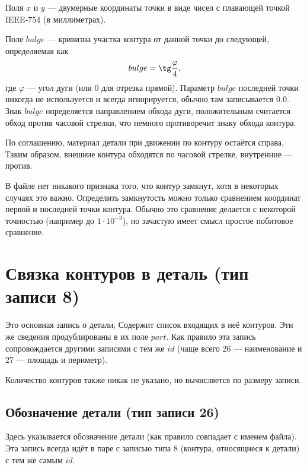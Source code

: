Поля
$x$ и $y$ ---
двумерные координаты точки в виде
чисел с плавающей точкой  IEEE-754
(в миллиметрах).

Поле
$bulge$ ---
кривизна участка контура от данной точки до следующей,
определяемая как
$$
bulge =
\tg \frac{\varphi}{4}
,
$$
где
$\varphi$ --- угол дуги
(или 0 для отрезка прямой).
Параметр $bulge$
последней точки никогда не используется и всегда игнорируется,
обычно там записывается $0.0$.
Знак
$bulge$
определяется направлением обхода дуги,
положительным считается обход против часовой стрелки,
что немного противоречит знаку обхода контура.

По соглашению,
материал детали при движении по контуру остаётся справа.
Таким образом, внешние контура обходятся по часовой стрелке,
внутренние --- против.

В файле нет никакого признака того,
что контур замкнут,
хотя в некоторых случаях это важно.
Определить замкнутость можно только сравнением координат первой и последней точки контура.
Обычно это сравнение делается с некоторой точностью
(например до $1\cdot 10^{-3}$),
но зачастую имеет смысл простое побитовое сравнение.

\section*{Связка контуров в деталь (тип записи 8)}
Это основная запись о детали,
Содержит список входящих в неё контуров.
Эти же сведения продублированы в их поле $part$.
Как правило эта запись сопровождается другими записями
с тем же $id$
(чаще всего 26 --- наименование и
27 --- площадь и периметр).


Количество контуров также никак не указано,
но вычисляется по размеру записи.

\subsection*{Обозначение детали (тип записи 26)}
Здесь указывается обозначение детали (как правило совпадает с именем файла).
Эта запись всегда идёт в паре с записью типа 8
(контура, относящиеся к детали)
с тем же самым $id$.

